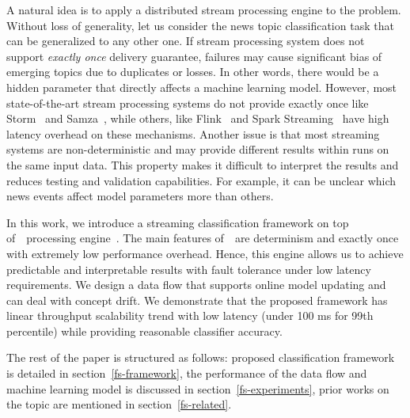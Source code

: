 A natural idea is to apply a distributed stream processing engine to the problem. Without loss of generality, let us consider the news topic classification task that can be generalized to any other one. If stream processing system does not support {\em exactly once} delivery guarantee, failures may cause significant bias of emerging topics due to duplicates or losses. In other words, there would be a hidden parameter that directly affects a machine learning model. However, most state-of-the-art stream processing systems do not provide exactly once like Storm~\cite{apache:storm} and Samza~\cite{Noghabi:2017:SSS:3137765.3137770}, while others, like Flink~\cite{Carbone:2017:SMA:3137765.3137777} and Spark Streaming~\cite{Zaharia:2012:DSE:2342763.2342773} have high latency overhead on these mechanisms. Another issue is that most streaming systems are non-deterministic and may provide different results within runs on the same input data. This property makes it difficult to interpret the results and reduces testing and validation capabilities. For example, it can be unclear which news events affect model parameters more than others. 

In this work, we introduce a streaming classification framework on top of~\FlameStream\ processing engine~\cite{we2018beyondmr, we2018adbis}. The main features of~\FlameStream\ are determinism and exactly once with extremely low performance overhead. Hence, this engine allows us to achieve predictable and interpretable results with fault tolerance under low latency requirements. We design a data flow that supports online model updating and can deal with concept drift. We demonstrate that the proposed framework has linear throughput scalability trend with low latency (under 100 ms for 99th percentile) while providing reasonable classifier accuracy.

The rest of the paper is structured as follows: proposed classification framework is detailed in section~\ref{fs-framework}, the performance of the data flow and machine learning model is discussed in section~\ref{fs-experiments}, prior works on the topic are mentioned in section~\ref{fs-related}.

